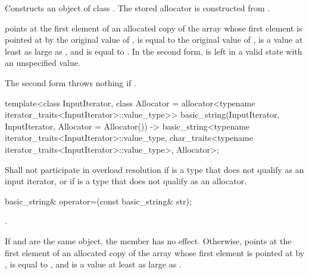 \begin{itemdescr}
\pnum
\effects Constructs an object of class .
The stored allocator is constructed from .

\pnum
\postconditions
{} points at the first element of an allocated copy
of the array whose first element is pointed at by the original
value of ,  is equal to the
original value of ,  is a value
at least as large as , and  is
equal to .
In the second form,  is left in a valid state with an
unspecified value.

\pnum
\throws The second form throws nothing if .
\end{itemdescr}

\begin{itemdecl}
template<class InputIterator,
         class Allocator = allocator<typename iterator_traits<InputIterator>::value_type>>
  basic_string(InputIterator, InputIterator, Allocator = Allocator())
    -> basic_string<typename iterator_traits<InputIterator>::value_type,
                    char_traits<typename iterator_traits<InputIterator>::value_type>,
                    Allocator>;
\end{itemdecl}

\begin{itemdescr}
\pnum
\remarks Shall not participate in overload resolution if
 is a type that does not qualify as an input iterator,
or if  is a type that does not qualify as an allocator.
\end{itemdescr}

%
\begin{itemdecl}
basic_string& operator=(const basic_string& str);
\end{itemdecl}

\begin{itemdescr}
\pnum
\returns
{}.

\pnum
\postconditions
If  and  are the same object, the member has no effect.
Otherwise,
 points at the first element of an allocated copy
of the array whose first element is pointed at by ,
 is equal to , and
 is a value at least as large as .
\end{itemdescr}

